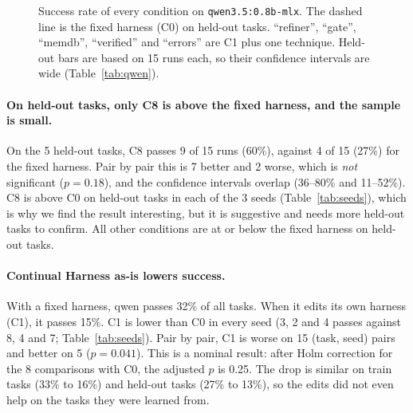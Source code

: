 \begin{figure}[t]
\centering
{}
\caption{Success rate of every condition on \texttt{qwen3.5:0.8b-mlx}. The dashed line is the
fixed harness (C0) on held-out tasks. ``refiner'', ``gate'', ``memdb'', ``verified'' and
``errors'' are C1 plus one technique. Held-out bars are based on 15 runs each, so their confidence
intervals are wide (Table~\ref{tab:qwen}).}
\label{fig:qwen}
\end{figure}

\paragraph{On held-out tasks, only C8 is above the fixed harness, and the sample is small.}
On the 5 held-out tasks, C8 passes 9 of 15 runs (60\%), against 4 of 15 (27\%) for the fixed
harness. Pair by pair this is 7 better and 2 worse, which is \emph{not} significant ($p = 0.18$),
and the confidence intervals overlap (36--80\% and 11--52\%). C8 is above C0 on held-out tasks in
each of the 3 seeds (Table~\ref{tab:seeds}), which is why we find the result interesting, but it
is suggestive and needs more held-out tasks to confirm. All other conditions are at or below the
fixed harness on held-out tasks.

\paragraph{Continual Harness as-is lowers success.}
With a fixed harness, qwen passes 32\% of all tasks. When it edits its own harness (C1), it passes
15\%. C1 is lower than C0 in every seed (3, 2 and 4 passes against 8, 4 and 7;
Table~\ref{tab:seeds}). Pair by pair, C1 is worse on 15 (task, seed) pairs and better on 5
($p = 0.041$). This is a nominal result: after Holm correction for the 8 comparisons with C0, the
adjusted $p$ is 0.25. The drop is similar on train tasks (33\% to 16\%) and held-out tasks (27\% to
13\%), so the edits did not even help on the tasks they were learned from.

